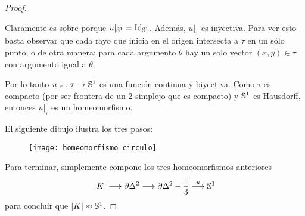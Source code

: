 \begin{proof}
\begin{enumerate}
			Claramente es sobre porque $u|_{\mathbb{S}^1}=\text{Id}_{\mathbb{S}^1}$. Adem\'as, $u|_{\tau}$ es inyectiva. Para ver
			esto basta observar que cada rayo que inicia en el origen intersecta a $\tau$ en un s\'olo punto, o
			de otra manera: para cada argumento $\theta$ hay un solo vector $(x,y)\in\tau$ con argumento
			igual a $\theta$.

		Por lo tanto $u|_{\tau}:\tau\rightarrow\mathbb{S}^1$ es una funci\'on continua y biyectiva. Como $\tau$ es compacto
		(por ser frontera de un 2-simplejo que es compacto) y $\mathbb{S}^1$ es Hausdorff, entonces $u|_{\tau}$
		es un homeomorfismo.
	\end{enumerate}

	El siguiente dibujo ilustra los tres pasos:
%
  \begin{figure}[h!]%
    \centering
    \texttt{[image: homeomorfismo\_circulo]}
  \end{figure}%
%

	Para terminar, simplemente compone los tres homeomorfismos anteriores
	\[
		\left| K \right| \longrightarrow \partial\Delta^2 \longrightarrow \partial\Delta^2-\frac{1}{3} \overset{u}{\longrightarrow} \mathbb{S}^1
	\]
	para concluir que $\left| K \right|\approx\mathbb{S}^1$.











\end{proof}%